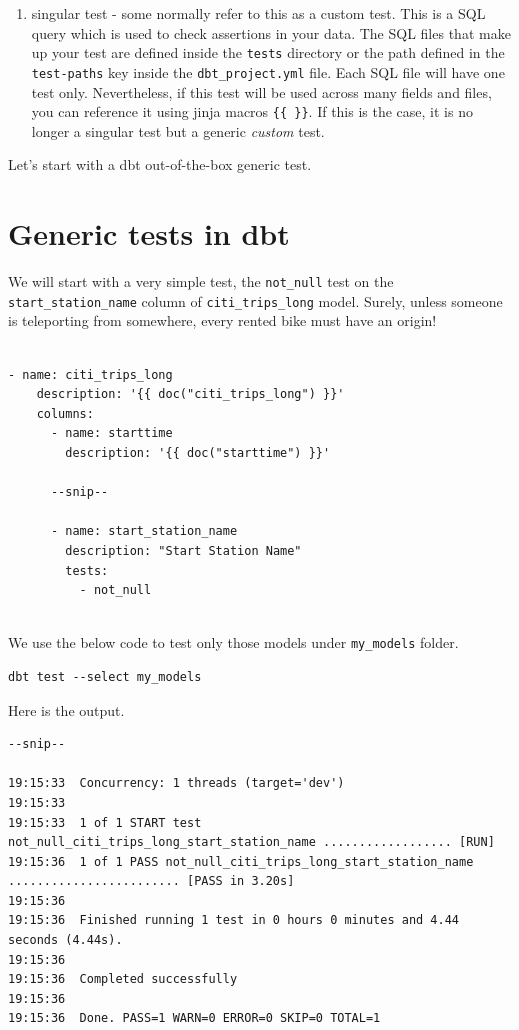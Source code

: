 \documentclass[
]{book}
\providecommand{\tightlist}{%
  \setlength{\itemsep}{0pt}\setlength{\parskip}{0pt}}
\begin{document}
\begin{enumerate}
\def\labelenumi{\arabic{enumi}.}
\setcounter{enumi}{1}
\tightlist
\item
  singular test - some normally refer to this as a custom test. This is a SQL query which is used to check assertions in your data. The SQL files that make up your test are defined inside the \texttt{tests} directory or the path defined in the \texttt{test-paths} key inside the \texttt{dbt\_project.yml} file. Each SQL file will have one test only. Nevertheless, if this test will be used across many fields and files, you can reference it using jinja macros \texttt{\{\{\ \}\}}. If this is the case, it is no longer a singular test but a generic \emph{custom} test.
\end{enumerate}

Let's start with a dbt out-of-the-box generic test.

\hypertarget{generic-tests-in-dbt}{%
\section{Generic tests in dbt}\label{generic-tests-in-dbt}}

We will start with a very simple test, the \texttt{not\_null} test on the \texttt{start\_station\_name} column of \texttt{citi\_trips\_long} model. Surely, unless someone is teleporting from somewhere, every rented bike must have an origin!

\begin{verbatim}

- name: citi_trips_long
    description: '{{ doc("citi_trips_long") }}'
    columns:
      - name: starttime
        description: '{{ doc("starttime") }}'

      --snip--

      - name: start_station_name
        description: "Start Station Name"
        tests:
          - not_null
          
\end{verbatim}

We use the below code to test only those models under \texttt{my\_models} folder.

\begin{verbatim}
dbt test --select my_models
\end{verbatim}

Here is the output.

\begin{verbatim}
--snip--

19:15:33  Concurrency: 1 threads (target='dev')
19:15:33  
19:15:33  1 of 1 START test not_null_citi_trips_long_start_station_name .................. [RUN]
19:15:36  1 of 1 PASS not_null_citi_trips_long_start_station_name ........................ [PASS in 3.20s]
19:15:36  
19:15:36  Finished running 1 test in 0 hours 0 minutes and 4.44 seconds (4.44s).
19:15:36  
19:15:36  Completed successfully
19:15:36  
19:15:36  Done. PASS=1 WARN=0 ERROR=0 SKIP=0 TOTAL=1
\end{verbatim}
\end{document}
